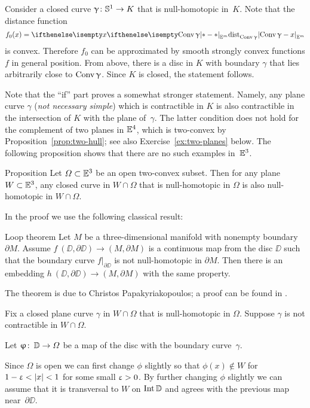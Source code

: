 Consider a closed curve $\gamma\:\SS^1\to K$ that is null-homotopic in~$K$.
Note that the distance function \[f_0(x)\z=\dist{\Conv\gamma}{x}{\EE^m}\] 
is convex.
Therefore $f_0$ can be approximated by smooth strongly convex functions $f$ in general position.
From above, there is a disc in $K$ with boundary $\gamma$
that lies arbitrarily close to $\mathop{\rm Conv}\nolimits\upgamma$.
Since $K$ is closed, the statement follows.
\qeds

Note that the ``if'' part proves a somewhat stronger statement.
Namely,  any plane curve $\gamma$ (\emph{not necessary simple}) which is  contractible in $K$ is also contractible in the intersection of $K$ with the plane of~$\gamma$.
The latter condition does not hold for the complement 
of two planes in $\mathbb{E}^4$, which is two-convex by Proposition~\ref{prop:two-hull};
see also Exercise~\ref{ex:two-planes} below.
The following proposition shows that there are no such examples in~$\mathbb{E}^3$.

\begin{thm}{Proposition}\label{prop:3d-strong-2-convexity}
Let $\Omega\subset\EE^3$ be an open two-convex subset.
Then for any plane $W\subset\EE^3$, 
any closed curve in $W\cap \Omega$ 
that is null-homotopic in $\Omega$ is also null-homotopic in $W\cap \Omega$.
\end{thm}

In the proof we use the following classical result:

\begin{thm}{Loop theorem}
Let $M$ be a three-dimensional manifold with nonempty boundary $\partial M$.
Assume 
$f\: (\DD,\partial \DD)\to (M,\partial M)$
is a continuous map from the disc $\DD$ such that the boundary curve $f|_{\partial \DD}$ is not null-homotopic in $\partial M$.  Then there is an embedding 
$h\: (\DD,\partial \DD)\to (M,\partial M)$ 
with the same property.
\end{thm}

The theorem is due to Christos Papakyriakopoulos; a proof can be found in \cite{hatcher}. 

Fix a closed plane curve $\gamma$ in $W\cap \Omega$ that  is null-homotopic in $\Omega$. Suppose $\gamma$ is not contractible in  $W\cap \Omega$.

Let $\phi\co \DD\to\Omega$ be a map of the disc with the boundary curve~$\gamma$.

Since $\Omega$ is open we can first change  $\phi$  slightly so that $\phi(x)\notin W$ for $1-\eps<|x|<1$ for some small $\upvarepsilon>0$.
By further changing $\phi$ slightly we can assume that it is transversal to $W$  on  $\mathop{\rm Int}\nolimits \mathbb{D}$ and agrees with the previous map near~$\partial \DD$.


